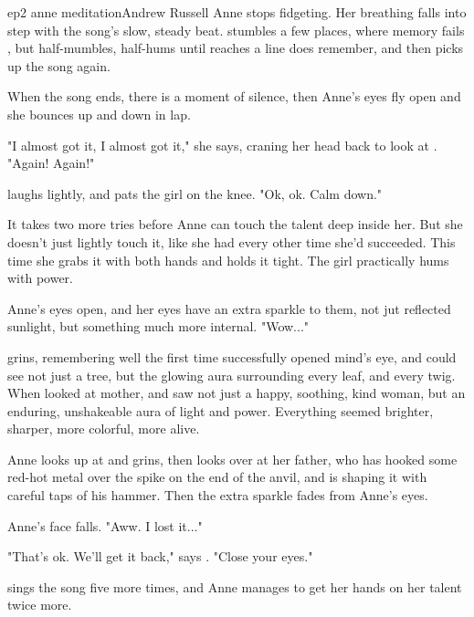 \documentclass{book}
\begin{document}
\begin{childnode}{ep2 anne meditation}{Andrew Russell}
    Anne stops fidgeting. Her breathing falls into step with the song's slow, steady beat. \name{} stumbles a few places, where \hisher{} memory fails \himher{}, but \heshe{} half-mumbles, half-hums 
    until \heshe{} reaches a line \heshe{} does
    remember, and then picks up the song again.

    When the song ends, there is a moment of silence, then Anne's eyes fly open and she bounces up and down in \names{} lap.

    "I almost got it, I almost got it," she says, craning her head back to look at \name{}. "Again! Again!"

    \name{} laughs lightly, and pats the girl on the knee. "Ok, ok. Calm down."

    It takes two more tries before Anne can touch the talent deep inside her. But she doesn't just lightly touch it, like she had every other time she'd succeeded. This time she grabs it with both hands and holds it tight. The girl practically hums with power. 

    Anne's eyes open, and her eyes have an extra sparkle to them, not jut reflected sunlight, but something much more internal. "Wow..." 

    \name{} grins, remembering well the first time \heshe{} successfully opened \hisher{} mind's eye, and could see not just a tree, but the glowing aura surrounding every leaf, and every twig. When \heshe{} looked at \hisher{} mother, and saw not just a 
    happy, soothing, kind woman, but an enduring, unshakeable aura of light and power. Everything seemed brighter, sharper, more colorful, more alive.

    Anne looks up at \name{} and grins, then looks over at her father, who has hooked some red-hot metal over the spike on the end of the anvil, and is shaping it with careful taps of his hammer. Then the extra sparkle fades from Anne's eyes.

    Anne's face falls. "Aww. I lost it..."

    "That's ok. We'll get it back," says \name{}. "Close your eyes."

    \name{} sings the song five more times, and Anne manages to get her hands on her talent twice more.



\end{childnode}
\end{document}
